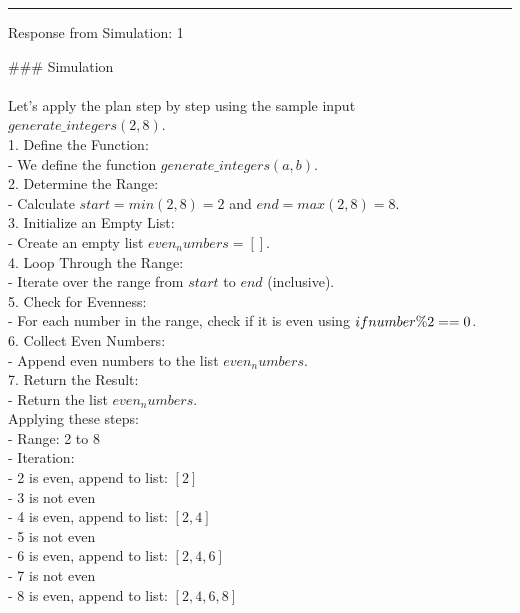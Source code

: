 \vspace{0.5cm} \hrule   \vspace{0.5cm}
Response from Simulation: 1


\#\#\# Simulation \\
 \\
Let's apply the plan step by step using the sample input $generate\_integers(2, 8)$. \\

1. \*\*Define the Function:\*\* \\
   - We define the function $generate\_integers(a, b)$. \\

2. \*\*Determine the Range:\*\* \\
   - Calculate $start = min(2, 8) = 2$ and $end = max(2, 8) = 8$. \\

3. \*\*Initialize an Empty List:\*\* \\
   - Create an empty list $even_numbers = []$. \\

4. \*\*Loop Through the Range:\*\* \\
   - Iterate over the range from $start$ to $end$ (inclusive). \\

5. \*\*Check for Evenness:\*\* \\
   - For each number in the range, check if it is even using $if \space number \% 2 == 0$. \\

6. \*\*Collect Even Numbers:\*\* \\
   - Append even numbers to the list $even_numbers$. \\

7. \*\*Return the Result:\*\* \\
   - Return the list $even_numbers$. \\

Applying these steps: \\

- Range: 2 to 8 \\
- Iteration: \\
  - 2 is even, append to list: $[2]$ \\
  - 3 is not even \\
  - 4 is even, append to list: $[2, 4]$ \\
  - 5 is not even \\
  - 6 is even, append to list: $[2, 4, 6]$ \\
  - 7 is not even \\
  - 8 is even, append to list: $[2, 4, 6, 8]$ \\


